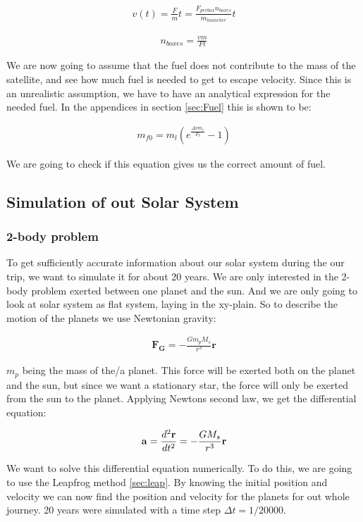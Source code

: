 \documentclass[a4paper, 10pt]{article}
\begin{document}
\begin{align}
v(t) = \frac{F}{m} t = \frac{F_{per box}n_{boxes}}{m_{launcher}} t
\end{align}

\begin{align}\label{eq:boxes}
n_{boxes} = \frac{v m}{F t}
\end{align}

We are now going to assume that the fuel does not contribute to the mass of the satellite, and see how much fuel is needed to get to escape velocity. Since this is an unrealistic assumption, we have to have an analytical expression for the needed fuel. In the appendices in section \ref{sec:Fuel} this is shown to be:

\begin{align}\label{eq:Fuel}
m_{f0} = m_l(e^{\frac{\Delta v m_e}{F_b}} - 1)
\end{align}

We are going to check if this equation gives us the correct amount of fuel.

\subsection{Simulation of out Solar System}
\subsubsection{2-body problem}
To get sufficiently accurate information about our solar system during the our trip, we want to simulate it for about 20 years. We are only interested in the 2-body problem exerted between one planet and the sun. And we are only going to look at solar system as flat system, laying in the xy-plain. So to describe the motion of the planets we use Newtonian gravity:

\begin{align}
\textbf{F}_\textbf{G} = -\frac{Gm_p M_s}{r^{3}}\textbf{r}
\end{align}

$m_p$ being the mass of the/a planet. This force will be exerted both on the planet and the sun, but since we want a stationary star, the force will only be exerted from the sun to the planet. Applying Newtons second law, we get the differential equation:

$$
\bold{a} = \frac{d^{2}\textbf{r}}{dt^{2}}  = -\frac{G M_s}{r^{3}}\textbf{r}
$$ 


We want to solve this differential equation numerically. To do this, we are going to use the Leapfrog method \ref{sec:leap}. By knowing the initial position and velocity we can now find the position and velocity for the planets for out whole journey. 20 years were simulated with a time step $\Delta t = 1/20000.$\\
\end{document}
